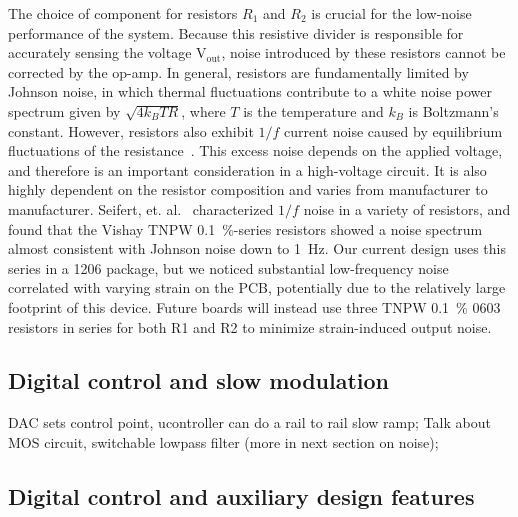 \documentclass[aip,rsi,reprint]{revtex4-1} %
\begin{document}
The choice of component for resistors $R_1$ and $R_2$ is crucial for the low-noise performance of the system. 
Because this resistive divider is responsible for accurately sensing the voltage $\text{V}_\text{out}$, noise introduced by these resistors cannot be corrected by the op-amp.
In general, resistors are fundamentally limited by Johnson noise, in which thermal fluctuations contribute to a white noise power spectrum given by $\sqrt{4 k_B T R}$, where $T$ is the temperature and $k_B$ is Boltzmann's constant\cite{Horowitz1989aCITECHAPTER}.
However, resistors also exhibit $1/f$ current noise caused by equilibrium fluctuations of the resistance~\cite{Clarke1974a,Voss1976a}.
This excess noise depends on the applied voltage, and therefore is an important consideration in a high-voltage circuit.
It is also highly dependent on the resistor composition and varies from manufacturer to manufacturer.
Seifert, et. al.~\cite{Seifert2009a} characterized $1/f$ noise in a variety of resistors, and found that the Vishay TNPW \SI{0.1}{\percent}-series resistors showed a noise spectrum almost consistent with Johnson noise down to \SI{1}{\hertz}.
Our current design uses this series in a 1206 package, but we noticed substantial low-frequency noise correlated with varying strain on the PCB, potentially due to the relatively large footprint of this device.
Future boards will instead use three TNPW \SI{0.1}{\percent} 0603 resistors in series for both R1 and R2 to minimize strain-induced output noise.

\subsection{Digital control and slow modulation}

DAC sets control point, ucontroller can do a rail to rail slow ramp;
Talk about MOS circuit, switchable lowpass filter (more in next section on noise); 


\subsection{Digital control and auxiliary design features}
\label{Sec:DigControlAuxDesign}
\end{document}
